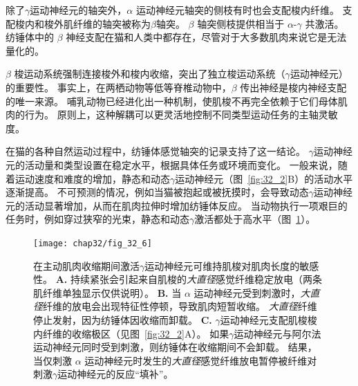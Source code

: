除了$ \gamma $运动神经元的轴突外，$ \alpha $ 运动神经元轴突的侧枝有时也会支配梭内纤维。
支配梭内和梭外肌纤维的轴突被称为$\beta$轴突。
$ \beta $ 轴突侧枝提供相当于 $ \alpha $-$ \gamma $ 共激活。
纺锤体中的 $ \beta $ 神经支配在猫和人类中都存在，尽管对于大多数肌肉来说它是无法量化的。


$ \beta $ 梭运动系统强制连接梭外和梭内收缩，突出了独立梭运动系统（$ \gamma $运动神经元）的重要性。
事实上，在两栖动物等低等脊椎动物中，$ \beta $ 传出神经是梭内神经支配的唯一来源。
哺乳动物已经进化出一种机制，使肌梭不再完全依赖于它们母体肌肉的行为。
原则上，这种解耦可以更灵活地控制不同类型运动任务的主轴灵敏度。


在猫的各种自然运动过程中，纺锤体感觉轴突的记录支持了这一结论。
$ \gamma $运动神经元的活动量和类型设置在稳定水平，根据具体任务或环境而变化。
一般来说，随着运动速度和难度的增加，静态和动态$ \gamma $运动神经元（图~\ref{fig:32_2}B）的活动水平逐渐提高。
不可预测的情况，例如当猫被抱起或被抚摸时，会导致动态$ \gamma $运动神经元的活动显著增加，从而在肌肉拉伸时增加纺锤体反应。 
当动物执行一项艰巨的任务时，例如穿过狭窄的光束，静态和动态$ \gamma $激活都处于高水平（图~\ref{fig:32_6}）。


\begin{figure}[htbp]
	\centering
	\texttt{[image: chap32/fig\_32\_6]}
	\caption{在主动肌肉收缩期间激活$ \gamma $运动神经元可维持肌梭对肌肉长度的敏感性\cite{hunt1951stretch}。 
	\textbf{A.} 持续紧张会引起来自肌梭的\textit{大直径}感觉纤维稳定放电（两条肌纤维单独显示仅供说明）。
	\textbf{B.} 当 $ \alpha $ 运动神经元受到刺激时，\textit{大直径}纤维的放电会出现特征性停顿，导致肌肉短暂收缩。
	\textit{大直径}纤维停止发射，因为纺锤体因收缩而卸载。
	\textbf{C.} $ \gamma $运动神经元支配肌梭梭内纤维的收缩极区（见图~\ref{fig:32_2}A）。
	如果$ \gamma $运动神经元与阿尔法运动神经元同时受到刺激，则纺锤体在收缩期间不会卸载。
	结果，当仅刺激 $ \alpha $ 运动神经元时发生的\textit{大直径}感觉纤维放电暂停被纤维对刺激$ \gamma $运动神经元的反应“填补”。}
	\label{fig:32_6}
\end{figure}


